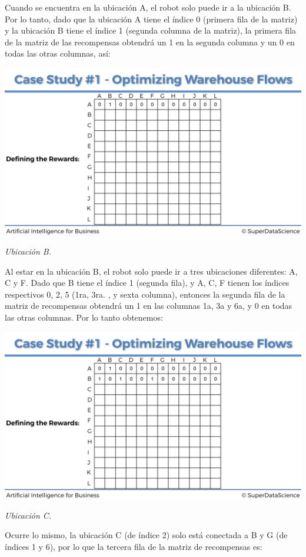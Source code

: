 \documentclass[
]{book}
\begin{document}
Cuando se encuentra en la ubicación A, el robot solo puede ir a la ubicación B. Por lo tanto, dado que la ubicación A tiene el índice 0 (primera fila de la matriz) y la ubicación B tiene el índice 1 (segunda columna de la matriz), la primera fila de la matriz de las recompensas obtendrá un 1 en la segunda columna y un 0 en todas las otras columnas, así:

\includegraphics{Images/Rewards_Matrix_1.png}

\emph{Ubicación B.}

Al estar en la ubicación B, el robot solo puede ir a tres ubicaciones diferentes: A, C y F. Dado que B tiene el índice 1 (segunda fila), y A, C, F tienen los índices respectivos 0, 2, 5 (1ra, 3ra. , y sexta columna), entonces la segunda fila de la matriz de recompensas obtendrá un 1 en las columnas 1a, 3a y 6a, y 0 en todas las otras columnas. Por lo tanto obtenemos:

\includegraphics{Images/Rewards_Matrix_2.png}

\emph{Ubicación C.}

Ocurre lo mismo, la ubicación C (de índice 2) solo está conectada a B y G (de índices 1 y 6), por lo que la tercera fila de la matriz de recompensas es:
\end{document}
